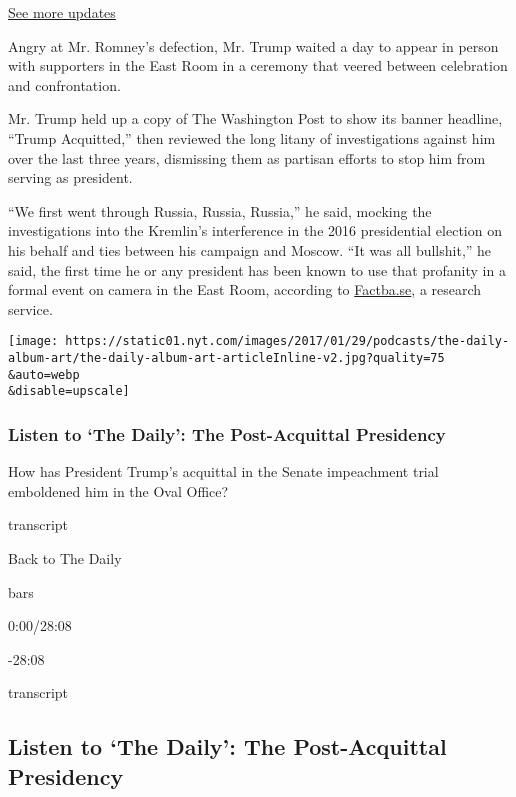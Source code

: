 \href{https://www.nytimes.com/2020/07/31/us/elections/biden-vs-trump.html?action=click\&pgtype=Article\&state=default\&region=MAIN_CONTENT_1\&context=storylines_live_updates}{See
more updates}

Angry at Mr. Romney's defection, Mr. Trump waited a day to appear in
person with supporters in the East Room in a ceremony that veered
between celebration and confrontation.

Mr. Trump held up a copy of The Washington Post to show its banner
headline, ``Trump Acquitted,'' then reviewed the long litany of
investigations against him over the last three years, dismissing them as
partisan efforts to stop him from serving as president.

``We first went through Russia, Russia, Russia,'' he said, mocking the
investigations into the Kremlin's interference in the 2016 presidential
election on his behalf and ties between his campaign and Moscow. ``It
was all bullshit,'' he said, the first time he or any president has been
known to use that profanity in a formal event on camera in the East
Room, according to \href{https://factba.se/}{Factba.se}, a research
service.

\texttt{[image: https://static01.nyt.com/images/2017/01/29/podcasts/the-daily-album-art/the-daily-album-art-articleInline-v2.jpg?quality=75\\\&auto=webp\\\&disable=upscale]}

\hypertarget{listen-to-the-daily-the-post-acquittal-presidency}{%
\subsubsection{Listen to `The Daily': The Post-Acquittal
Presidency}\label{listen-to-the-daily-the-post-acquittal-presidency}}

How has President Trump's acquittal in the Senate impeachment trial
emboldened him in the Oval Office?

transcript

Back to The Daily

bars

0:00/28:08

-28:08

transcript

\hypertarget{listen-to-the-daily-the-post-acquittal-presidency-1}{%
\subsection{Listen to `The Daily': The Post-Acquittal
Presidency}\label{listen-to-the-daily-the-post-acquittal-presidency-1}}

